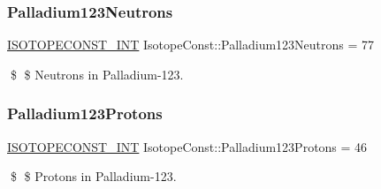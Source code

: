 \subsubsection{\texorpdfstring{Palladium123\+Neutrons}{Palladium123Neutrons}}
{\footnotesize\ttfamily \mbox{\hyperlink{group___isotope_const-_macros_ga5f18360b3e99483a35c32d789e62621c}{I\+S\+O\+T\+O\+P\+E\+C\+O\+N\+S\+T\+\_\+\+I\+NT}} Isotope\+Const\+::\+Palladium123\+Neutrons = 77}

\$ \$ Neutrons in Palladium-\/123. \mbox{\label{group___isotope_const-_palladium-_pd123_ga7de22534dc462efa57d6eea83cf27458}} 
\subsubsection{\texorpdfstring{Palladium123\+Protons}{Palladium123Protons}}
{\footnotesize\ttfamily \mbox{\hyperlink{group___isotope_const-_macros_ga5f18360b3e99483a35c32d789e62621c}{I\+S\+O\+T\+O\+P\+E\+C\+O\+N\+S\+T\+\_\+\+I\+NT}} Isotope\+Const\+::\+Palladium123\+Protons = 46}

\$ \$ Protons in Palladium-\/123. 